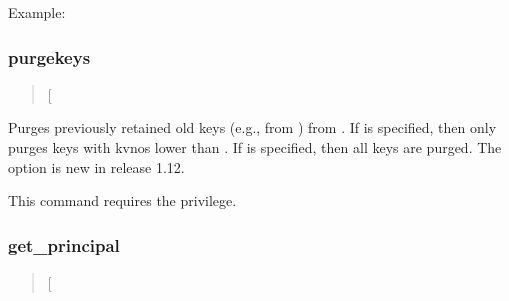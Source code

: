 \documentclass[letterpaper,10pt,english]{sphinxmanual}
\begin{document}
Example:

%
\begin{sphinxVerbatim}[commandchars=\\\{\}]
  
    
    
   
\end{sphinxVerbatim}
\label{\detokenize{admin/admin_commands/kadmin_local:change-password-end}}

\subsubsection{purgekeys}
\label{\detokenize{admin/admin_commands/kadmin_local:id6}}\label{\detokenize{admin/admin_commands/kadmin_local:change-password-end}}\label{\detokenize{admin/admin_commands/kadmin_local:purgekeys}}\begin{quote}

 {[}\textbar{} \sphinxstyleemphasis{oldest\_kvno\_to\_keep}{]} 
\end{quote}

Purges previously retained old keys (e.g., from ) from .  If  is specified, then
only purges keys with kvnos lower than .  If
 is specified, then all keys are purged.  The  option
is new in release 1.12.

This command requires the  privilege.

\label{\detokenize{admin/admin_commands/kadmin_local:purgekeys-end}}

\subsubsection{get\_principal}
\label{\detokenize{admin/admin_commands/kadmin_local:get-principal}}\label{\detokenize{admin/admin_commands/kadmin_local:id7}}\label{\detokenize{admin/admin_commands/kadmin_local:purgekeys-end}}\begin{quote}

 {[}\sphinxstylestrong{-terse}{]} 
\end{quote}
\end{document}
